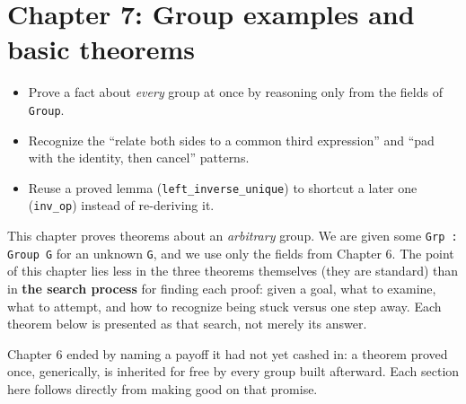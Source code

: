 \chapter{Chapter 7: Group examples and basic theorems}\label{sec:07-group-theorems:00-index:1}

\begin{learningobjectives}
\begin{itemize}
\tightlist
\item
  Prove a fact about \emph{every} group at once by reasoning only from the fields of \texttt{Group}.
\item
  Recognize the ``relate both sides to a common third expression'' and ``pad with the identity, then cancel'' patterns.
\item
  Reuse a proved lemma (\texttt{left\_\allowbreak{}inverse\_\allowbreak{}unique}) to shortcut a later one (\texttt{inv\_\allowbreak{}op}) instead of re-deriving it.
\end{itemize}
\end{learningobjectives}


This chapter proves theorems about an \emph{arbitrary} group. We are given some \texttt{Grp : Group G} for an unknown \texttt{G}, and we use only the fields from Chapter 6. The point of this chapter lies less in the three theorems themselves (they are standard) than in \textbf{the search process} for finding each proof: given a goal, what to examine, what to attempt, and how to recognize being stuck versus one step away. Each theorem below is presented as that search, not merely its answer.

Chapter 6 ended by naming a payoff it had not yet cashed in: a theorem proved once, generically, is inherited for free by every group built afterward. Each section here follows directly from making good on that promise.

